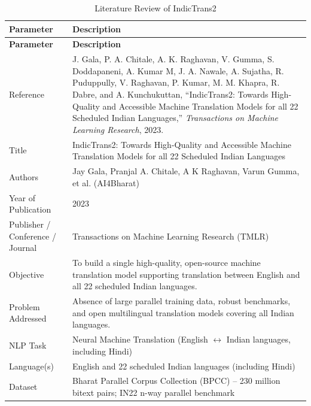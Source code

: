 \begin{longtable}{|p{5cm}|p{10cm}|}
\caption{Literature Review of IndicTrans2}
\label{tab:paper1}\\

\hline
\textbf{Parameter} & \textbf{Description} \\
\hline
\endfirsthead

\hline
\textbf{Parameter} & \textbf{Description} \\
\hline
\endhead

Reference &
J. Gala, P. A. Chitale, A. K. Raghavan, V. Gumma, S. Doddapaneni, A. Kumar M, J. A. Nawale, A. Sujatha, R. Puduppully, V. Raghavan, P. Kumar, M. M. Khapra, R. Dabre, and A. Kunchukuttan, ``IndicTrans2: Towards High-Quality and Accessible Machine Translation Models for all 22 Scheduled Indian Languages,'' \textit{Transactions on Machine Learning Research}, 2023.
\\ \hline

Title &
IndicTrans2: Towards High-Quality and Accessible Machine Translation Models for all 22 Scheduled Indian Languages
\\ \hline

Authors &
Jay Gala, Pranjal A. Chitale, A K Raghavan, Varun Gumma, et al. (AI4Bharat)
\\ \hline

Year of Publication &
2023
\\ \hline

Publisher / Conference / Journal &
Transactions on Machine Learning Research (TMLR)
\\ \hline

Objective &
To build a single high-quality, open-source machine translation model supporting translation between English and all 22 scheduled Indian languages.
\\ \hline

Problem Addressed &
Absence of large parallel training data, robust benchmarks, and open multilingual translation models covering all Indian languages.
\\ \hline

NLP Task &
Neural Machine Translation (English $\leftrightarrow$ Indian languages, including Hindi)
\\ \hline

Language(s) &
English and 22 scheduled Indian languages (including Hindi)
\\ \hline

Dataset &
Bharat Parallel Corpus Collection (BPCC) -- 230 million bitext pairs; IN22 n-way parallel benchmark
\\ \hline


\end{longtable}
